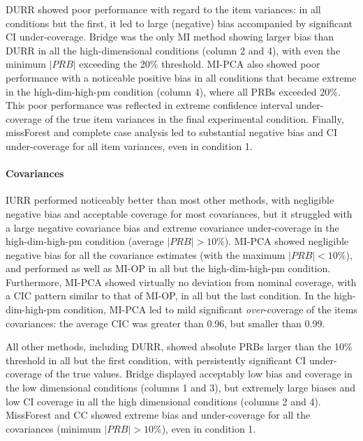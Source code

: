 	DURR showed poor performance with regard to the item variances: in all conditions but the first, it led to 
	large (negative) bias accompanied by significant CI under-coverage.
	Bridge was the only MI method showing larger bias than DURR in all the high-dimensional conditions (column 2 and 4),
	with even the minimum $|PRB|$ exceeding the 20\% threshold.
	MI-PCA also showed poor performance with a noticeable positive bias in all conditions that became extreme in the
	high-dim-high-pm condition (column 4), where all PRBs exceeded 20\%.
	This poor performance was reflected in extreme confidence interval under-coverage of the true item variances in
	the final experimental condition.
	Finally, missForest and complete case analysis led to substantial negative bias and CI under-coverage for all 
	item variances, even in condition 1.

	\paragraph{Covariances}
	IURR performed noticeably better than most other methods, with negligible negative bias and acceptable 
	coverage for most covariances, but it struggled with a large negative covariance bias and extreme covariance 
	under-coverage in the high-dim-high-pm condition (average $|PRB| > 10\%$).
	MI-PCA showed negligible negative bias for all the covariance estimates (with the maximum $|PRB| < 10\%$), 
	and performed as well as MI-OP in all but the high-dim-high-pm condition.
	Furthermore, MI-PCA showed virtually no deviation from nominal coverage, with a CIC pattern similar to 
	that of MI-OP, in all but the last condition.
	In the high-dim-high-pm condition, MI-PCA led to mild significant \emph{over}-coverage of the 
	items covariances: the average CIC was greater than 0.96, but smaller than 0.99.

	All other methods, including DURR, showed absolute PRBs larger than the 10\% threshold in all but the 
	first condition, with persistently significant CI under-coverage of the true values.
	Bridge displayed acceptably low bias and coverage in the low dimensional conditions (columns 1 and 3), but 
	extremely large biases and low CI coverage in all the high dimensional conditions (columns 2 and 4).
	MissForest and CC showed extreme bias and under-coverage for all the covariances (minimum $|PRB|>10\%$),
	even in condition 1.
	
